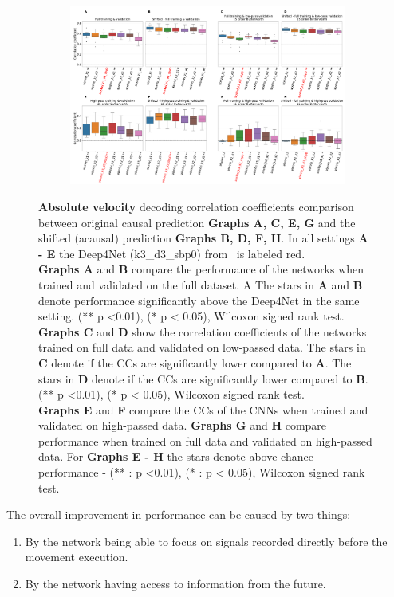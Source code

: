 \begin{figure}[!htbp]\ContinuedFloat
\begin{subfigure}[t]{\textwidth}
   \includegraphics[width=1\linewidth]{img/ch4/original_vs_shifted_absVel_performance_comparison}
   \caption{}
   \label{fig:shifted-performance-absVel}
\end{subfigure}
\caption[Absolute velocity: non-shifted vs. shifted setting performances]{{\textbf{Absolute velocity} decoding correlation coefficients comparison between original causal prediction \textbf{Graphs A, C, E, G} and the shifted (acausal) prediction \textbf{Graphs B, D, F, H}. In all settings \textbf{
   A - E} the Deep4Net (k3\_d3\_sbp0) from~\cite{Hammer-2021} is labeled red.\\ \textbf{Graphs A} and \textbf{B} compare the performance of the networks when trained and validated on the full dataset. A The stars in \textbf{A} and \textbf{B} denote performance significantly above the Deep4Net in the same setting. (** p <0.01), (* p < 0.05), Wilcoxon signed rank test.
   \\\textbf{Graphs C} and \textbf{D} show the correlation coefficients of the networks trained on full data and validated on low-passed data. 
   The stars in \textbf{C} denote if the CCs are significantly lower compared to \textbf{A}. The stars in \textbf{D} denote if the CCs are significantly lower compared to \textbf{B}. (** p <0.01), (* p < 0.05), Wilcoxon signed rank test.
   \\\textbf{Graphs E} and \textbf{F} compare the CCs of the CNNs when trained and validated on high-passed data. \textbf{Graphs G} and \textbf{H} compare performance when trained on full data and validated on high-passed data. For \textbf{Graphs E - H} the stars denote above chance performance - (** : p <0.01), (* : p < 0.05), Wilcoxon signed rank test.}}
   \label{fig:shifted-performance}
\end{figure}
\clearpage
The overall improvement in performance can be caused by two things:
\begin{enumerate}
    \item By the network being able to focus on signals recorded directly before the movement execution.
    \item By the network having access to information from the future.
\end{enumerate}

